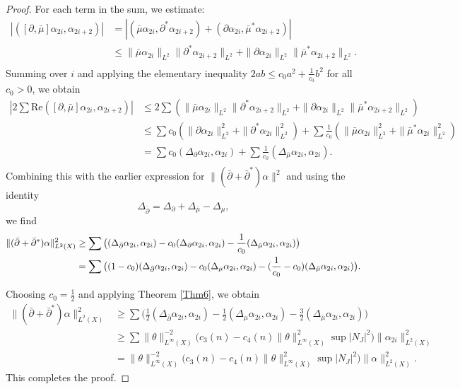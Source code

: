 \documentclass[10pt,a4paper]{amsart}
\def \De {\Delta}
\def \a {\alpha }
\def\pa{\partial}
\begin{document}
\begin{proof}
	For each term in the sum, we estimate:
	\begin{equation*}
	\begin{split}
	|([\pa,\bar{\mu}]\a_{2i},\a_{2i+2})|&=|(\bar{\mu}\a_{2i},\pa^{\ast}\a_{2i+2})+(\pa\a_{2i},\bar{\mu}^{\ast}\a_{2i+2})|\\
	&\leq \|\bar{\mu}\a_{2i}\|_{L^{2}}\|\pa^{\ast}\a_{2i+2}\|_{L^{2}}+ \|\pa\a_{2i}\|_{L^{2}}\|\bar{\mu}^{\ast}\a_{2i+2}\|_{L^{2}}.\\
	\end{split}
	\end{equation*}
	Summing over $i$ and applying the elementary inequality $2ab\leq c_{0}a^{2}+\frac{1}{c_{0}}b^{2}$
	for all $c_{0}>0$, we obtain
	\begin{equation*}
	\begin{split}
	|2\sum\mathrm{Re}([\pa,\bar{\mu}]\a_{2i},\a_{2i+2})|
	&\leq2\sum(\|\bar{\mu}\a_{2i}\|_{L^{2}}\|\pa^{\ast}\a_{2i+2}\|_{L^{2}}+ \|\pa\a_{2i}\|_{L^{2}}\|\bar{\mu}^{\ast}\a_{2i+2}\|_{L^{2}})\\
	&\leq \sum c_{0}(\|\pa\a_{2i}\|^2_{L^{2}}+\|\pa^{\ast}\a_{2i}\|^2_{L^{2}})
	+\sum\frac{1}{c_{0}}(\|\bar{\mu}\a_{2i}\|^2_{L^{2}}+\|\bar{\mu}^{\ast}\a_{2i}\|^2_{L^{2}})\\
	&=\sum c_{0}(\De_{\pa}\a_{2i},\a_{2i})+\sum\frac{1}{c_{0}}(\De_{\bar{\mu}}\a_{2i},\a_{2i}).\\
	\end{split}
	\end{equation*}	
	Combining this with the earlier expression for $\|({\bar{\partial}+\bar{\partial}^{\ast}})\a\|^{2}$ and using the identity $$\De_{\bar{\pa}}=\De_{\pa}+\De_{\bar{\mu}}-\De_{\mu},$$
	we find 
	\begin{equation*}
	\begin{split}
	\|({\bar{\partial}+\bar{\partial}^{\ast}})\a\|_{L^{2}(X)}^{2}&\geq\sum\big{(}(\De_{\bar{\pa}}\a_{2i},\a_{2i})- c_{0}(\De_{\pa}\a_{2i},\a_{2i})-\frac{1}{c_{0}}(\De_{\bar{\mu}}\a_{2i},\a_{2i})\big{)}\\
	&=\sum\big{(}(1-c_{0})(\De_{\bar{\pa}}\a_{2i},\a_{2i})- c_{0}(\De_{\mu}\a_{2i},\a_{2i})-(\frac{1}{c_{0}}-c_{0})(\De_{\bar{\mu}}\a_{2i},\a_{2i})\big{)}.\\
	\end{split}
	\end{equation*}
	
	Choosing $c_{0} = \frac{1}{2}$ and applying Theorem \ref{Thm6}, we obtain
	\begin{equation*}
	\begin{split}
	\|({\bar{\partial}+\bar{\partial}^{\ast}})\a\|_{L^{2}(X)}^{2}
	&\geq\sum\Big(\frac{1}{2}(\De_{\bar{\pa}}\a_{2i},\a_{2i})-\frac{1}{2}(\De_{\mu}\a_{2i},\a_{2i})-\frac{3}{2}(\De_{\bar{\mu}}\a_{2i},\a_{2i})\Big)\\
	&\geq \sum \|\theta\|^{-2}_{L^{\infty}(X)}\Big(c_{3}(n)-c_{4}(n)\|\theta\|^{2}_{L^{\infty}(X)}\sup|N_J|^{2}\Big)\|\a_{2i}\|^{2}_{L^{2}(X)}\\
	&= \|\theta\|^{-2}_{L^{\infty}(X)}\Big(c_{3}(n)-c_{4}(n)\|\theta\|^{2}_{L^{\infty}(X)}\sup|N_J|^{2}\Big)\|\a\|_{L^{2}(X)}^{2}.
	\end{split}
	\end{equation*}
	This completes the proof.
\end{proof}
\end{document}
